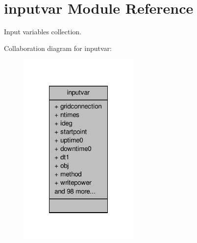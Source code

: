 \hypertarget{classinputvar}{\section{inputvar Module Reference}
\label{classinputvar}
}


Input variables collection.  




Collaboration diagram for inputvar\-:\nopagebreak
\begin{figure}[H]
\begin{center}
\leavevmode
\includegraphics[width=168pt]{classinputvar__coll__graph}
\end{center}
\end{figure}
